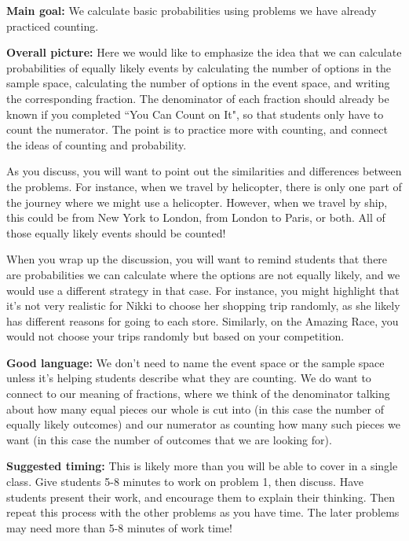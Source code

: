 \documentclass[noauthor,nooutcomes, handout]{ximera}
\begin{document}
\begin{instructorNotes}
{\bf Main goal:} We calculate basic probabilities using problems we have already practiced counting.

{\bf Overall picture:} 
Here we would like to emphasize the idea that we can calculate probabilities of equally likely events by calculating the number of options in the sample space, calculating the number of options in the event space, and writing the corresponding fraction. The denominator of each fraction should already be known if you completed ``You Can Count on It", so that students only have to count the numerator. The point is to practice more with counting, and connect the ideas of counting and probability.

As you discuss, you will want to point out the similarities and differences between the problems. For instance, when we travel by helicopter, there is only one part of the journey where we might use a helicopter. However, when we travel by ship, this could be from New York to London, from London to Paris, or both. All of those equally likely events should be counted!

When you wrap up the discussion, you will want to remind students that there are probabilities we can calculate where the options are not equally likely, and we would use a different strategy in that case. For instance, you might highlight that it's not very realistic for Nikki to choose her shopping trip randomly, as she likely has different reasons for going to each store. Similarly, on the Amazing Race, you would not choose your trips randomly but based on your competition.




{\bf Good language:} We don't need to name the event space or the sample space unless it's helping students describe what they are counting. We do want to connect to our meaning of fractions, where we think of the denominator talking about how many equal pieces our whole is cut into (in this case the number of equally likely outcomes) and our numerator as counting how many such pieces we want (in this case the number of outcomes that we are looking for). 

{\bf Suggested timing:}  This is likely more than you will be able to cover in a single class. Give students 5-8 minutes to work on problem 1, then discuss. Have students present their work, and encourage them to explain their thinking. Then repeat this process with the other problems as you have time. The later problems may need more than 5-8 minutes of work time!


\end{instructorNotes}
\end{document}
